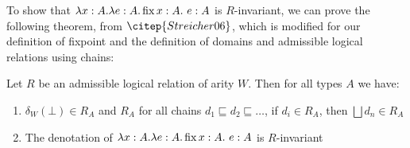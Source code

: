 To show that $\lambda x : A. \lambda e : A. \operatorname{fix} x : A. \ e : A$ is $R$-invariant, we can prove the following theorem, from $\citep{Streicher06}$, which is modified for our definition of fixpoint and the definition of domains and admissible logical relations using chains:

\vspace{0.5cm}

\begin{thm}{\citep{Streicher06}}\label{adm}
Let $R$ be an admissible logical relation of arity $W$. Then for all types $A$ we have:

\begin{enumerate}
\item{$\delta_W(\bot) \in R_A$ and $R_A$ for all chains $d_1 \sqsubseteq d_2 \sqsubseteq \dots$, if  $d_i \in R_A$, then $\bigsqcup d_n \in R_A$}
\item{The denotation of $\lambda x : A. \lambda e : A. \operatorname{fix} x : A. \ e : A$ is $R$-invariant}
\end{enumerate}
\end{thm}


